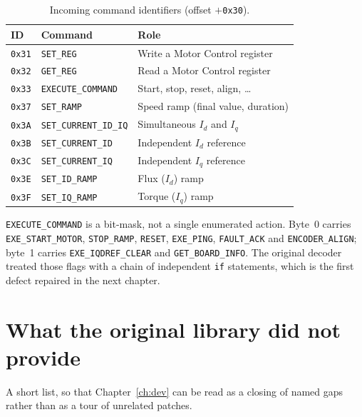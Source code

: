 \begin{table}[ht]
\centering
\caption{Incoming command identifiers (offset $+$\texttt{0x30}).}
\label{tab:cmd-map}
\begin{tabular}{llp{70mm}}
\toprule
ID & Command & Role \\
\midrule
\texttt{0x31} & \texttt{SET\_REG}            & Write a Motor Control register \\
\texttt{0x32} & \texttt{GET\_REG}            & Read a Motor Control register \\
\texttt{0x33} & \texttt{EXECUTE\_COMMAND}    & Start, stop, reset, align, \ldots \\
\texttt{0x37} & \texttt{SET\_RAMP}           & Speed ramp (final value, duration) \\
\texttt{0x3A} & \texttt{SET\_CURRENT\_ID\_IQ}& Simultaneous $I_d$ and $I_q$ \\
\texttt{0x3B} & \texttt{SET\_CURRENT\_ID}    & Independent $I_d$ reference \\
\texttt{0x3C} & \texttt{SET\_CURRENT\_IQ}    & Independent $I_q$ reference \\
\texttt{0x3E} & \texttt{SET\_ID\_RAMP}       & Flux ($I_d$) ramp \\
\texttt{0x3F} & \texttt{SET\_IQ\_RAMP}       & Torque ($I_q$) ramp \\
\bottomrule
\end{tabular}
\end{table}

\texttt{EXECUTE\_COMMAND} is a bit-mask, not a single enumerated action.
Byte~0 carries \texttt{EXE\_START\_MOTOR}, \texttt{STOP\_RAMP},
\texttt{RESET}, \texttt{EXE\_PING}, \texttt{FAULT\_ACK} and
\texttt{ENCODER\_ALIGN}; byte~1 carries \texttt{EXE\_IQDREF\_CLEAR} and
\texttt{GET\_BOARD\_INFO}. The original decoder treated those flags with a
chain of independent \texttt{if} statements, which is the first defect
repaired in the next chapter.

\section{What the original library did not provide}
\label{sec:gaps}

A short list, so that Chapter~\ref{ch:dev} can be read as a closing of
named gaps rather than as a tour of unrelated patches.

